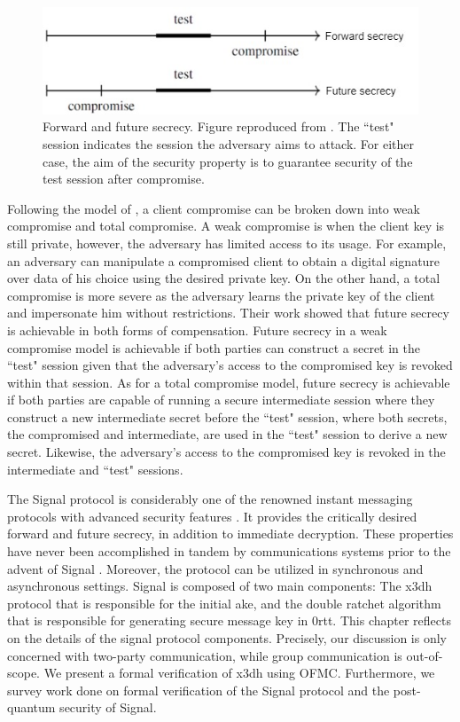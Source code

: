 \begin{figure}[htbp]
	\centering
	\includegraphics[scale=0.4]{Images/ffsecrecy.jpg}
	\caption[Forward and future secrecy]{Forward and future secrecy. Figure reproduced from \cite{cohn2016post}. The ``test" session indicates the session the adversary aims to attack. For either case, the aim of the security property is to guarantee security of the test session after compromise.}
	\label{forward-future_secrecy}
\end{figure}
Following the model of \cite{cohn2016post}, a client compromise can be broken down into weak compromise and total compromise. A weak compromise is when the client key is still private, however, the adversary has limited access to its usage. For example, an adversary can manipulate a compromised client to obtain a digital signature over data of his choice using the desired private key. On the other hand, a total compromise is more severe as the adversary learns the private key of the client and impersonate him without restrictions. Their work showed that future secrecy is achievable in both forms of compensation. Future secrecy in a weak compromise model is achievable if both parties can construct a secret in the ``test" session given that the adversary's access to the compromised key is revoked within that session. As for a total compromise model, future secrecy is achievable if both parties are capable of running a secure intermediate session where they construct a new intermediate secret before the ``test" session, where both secrets, the compromised and intermediate, are used in the ``test" session to derive a new secret. Likewise, the adversary's access to the compromised key is revoked in the intermediate and ``test" sessions.
\par
The Signal protocol is considerably one of the renowned instant messaging protocols with advanced security features \cite{unger2015sok}. It provides the critically desired forward and future secrecy, in addition to immediate decryption.
These properties have never been accomplished in tandem by communications systems prior to the advent of Signal \cite{alwen_coretti_dodis_2020}.
Moreover, the protocol can be utilized in synchronous and asynchronous settings. Signal is composed of two main components: The \gls{x3dh} protocol \cite{x3dh} that is responsible for the initial \gls{ake}, and the double ratchet algorithm \cite{dblRtcht} that is responsible for generating secure message key in \gls{0rtt}. This chapter reflects on the details of the signal protocol components. Precisely, our discussion is only concerned with two-party communication, while group communication is out-of-scope. We present a formal verification of \gls{x3dh} using OFMC. Furthermore, we survey work done on formal verification of the Signal protocol and the post-quantum security of Signal.